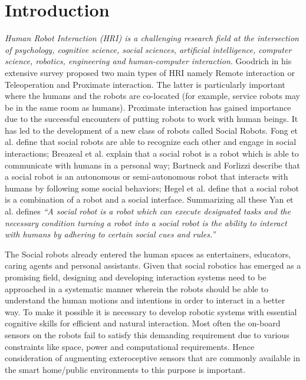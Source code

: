 \documentclass{llncs}
\begin{document}
\section{Introduction}
%
\emph{Human Robot Interaction (HRI) is a challenging research field at the intersection of psychology, cognitive science, social sciences, artificial intelligence, computer science, robotics, engineering and human-computer interaction}\cite{Dautenhahn2007}. Goodrich\cite{Goodrich:2007:HIS:1348099.1348100} in his extensive survey proposed two main types of HRI namely Remote interaction or Teleoperation and Proximate interaction. The latter is particularly important where the humans and the robots are co-located (for example, service robots may be in the same room as humans). Proximate interaction has gained importance due to the successful encounters of putting robots to work with human beings. It has led to the development of a new class of robots called Social Robots. Fong et al. \cite{Fong2003} define that social robots are able to recognize each other and engage in social interactions; Breazeal et al.\cite{Breazeal:2002:DSR:515422} explain that a social robot is a robot which is able to communicate with humans in a personal way; Bartneck and Forlizzi \cite{Bartneck2004} describe that a social robot is an autonomous or semi-autonomous robot that interacts with humans by following some social behaviors; Hegel et al. \cite{Hegel2009} define that a social robot is a combination of a robot and a social interface. Summarizing all these Yan et al. \cite{Yan2014} defines \emph{“A social robot is a robot which can execute designated tasks and the necessary condition turning a robot into a social robot is the ability to interact with humans by adhering to certain social cues and rules.”}

The Social robots already entered the human spaces as entertainers\cite{NaoTheRobot}, educators\cite{NaoTheRobot}, caring agents\cite{ASKNao} and personal assistants\cite{ProjectRomeo}. Given that social robotics has emerged as a promising field, designing and developing interaction systems need to be approached in a systematic manner wherein the robots should be able to understand the human motions and intentions in order to interact in a better way. To make it possible it is necessary to develop robotic systems with essential cognitive skills for efficient and natural interaction. Most often the on-board sensors on the robots fail to satisfy this demanding requirement due to various constraints like space, power and computational requirements. Hence consideration of augmenting exteroceptive sensors that are commonly available in the smart home/public environments to this purpose is important.
\end{document}
